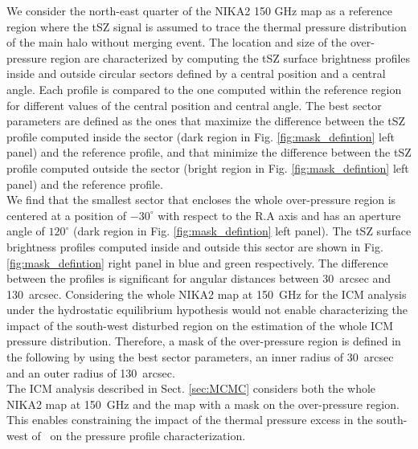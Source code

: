 \documentclass[traditabstract]{aa}
\begin{document}
\indent We consider the north-east quarter of the NIKA2 150 GHz map as a reference region where the tSZ signal is assumed to trace the thermal pressure distribution of the main halo without merging event. The location and size of the over-pressure region are characterized by computing the tSZ surface brightness profiles inside and outside circular sectors defined by a central position and a central angle. Each profile is compared to the one computed within the reference region for different values of the central position and central angle. The best sector parameters are defined as the ones that maximize the difference between the tSZ profile computed inside the sector (dark region in Fig. \ref{fig:mask_defintion} left panel) and the reference profile, and that minimize the difference between the tSZ profile computed outside the sector (bright region in Fig. \ref{fig:mask_defintion} left panel) and the reference profile.\\
\indent We find that the smallest sector that encloses the whole over-pressure region is centered at a position of $-30^{\circ}$ with respect to the R.A axis and has an aperture angle of $120^{\circ}$ (dark region in Fig. \ref{fig:mask_defintion} left panel). The tSZ surface brightness profiles computed inside and outside this sector are shown in Fig. \ref{fig:mask_defintion} right panel in blue and green respectively. The difference between the profiles is significant for angular distances between 30~arcsec and 130~arcsec. Considering the whole NIKA2 map at 150~GHz for the ICM analysis under the hydrostatic equilibrium hypothesis would not enable characterizing the impact of the south-west disturbed region on the estimation of the whole ICM pressure distribution. Therefore, a mask of the over-pressure region is defined in the following by using the best sector parameters, an inner radius of 30~arcsec and an outer radius of 130~arcsec.\\
\indent The ICM analysis described in Sect. \ref{sec:MCMC} considers both the whole NIKA2 map at 150~GHz and the map with a mask on the over-pressure region. This enables constraining the impact of the thermal pressure excess in the south-west of \psz\ on the pressure profile characterization.
\end{document}
